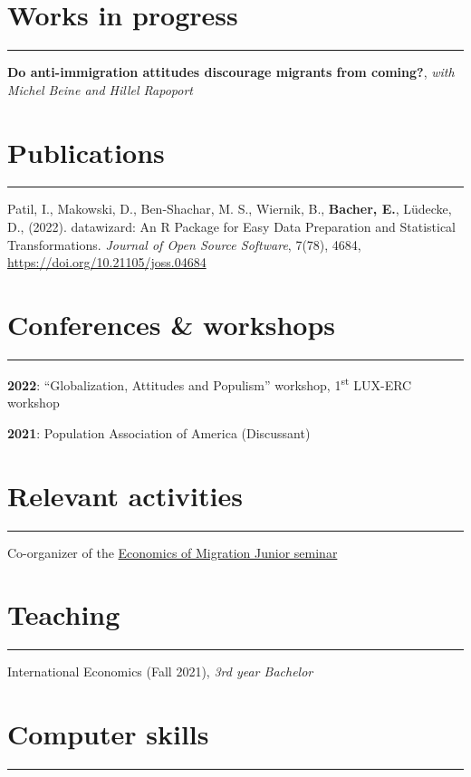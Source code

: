 \documentclass{article}
\newcommand{\sectionline}{%
  \vspace{-0.5cm}%
  \par\noindent\rule{\textwidth}{0.4pt}%
  \vspace{0.3cm}%
}
\let\xsection=\section
\renewcommand{\section}[1]{%
  \vspace{0.4cm}%
  \xsection*{#1}%
  \sectionline%
}
\begin{document}
\hypertarget{works-in-progress}{%
\section{Works in progress}\label{works-in-progress}}

\textbf{Do anti-immigration attitudes discourage migrants from coming?},
\emph{with Michel Beine and Hillel Rapoport}

\hypertarget{publications}{%
\section{Publications}\label{publications}}

Patil, I., Makowski, D., Ben-Shachar, M. S., Wiernik, B.,
\textbf{Bacher, E.}, Lüdecke, D., (2022). datawizard: An R Package for
Easy Data Preparation and Statistical Transformations. \emph{Journal of
Open Source Software}, 7(78), 4684,
\url{https://doi.org/10.21105/joss.04684}

\hypertarget{conferences-workshops}{%
\section{Conferences \& workshops}\label{conferences-workshops}}

\textbf{2022}: ``Globalization, Attitudes and Populism'' workshop,
1\textsuperscript{st} LUX-ERC workshop

\textbf{2021}: Population Association of America (Discussant)

\hypertarget{relevant-activities}{%
\section{Relevant activities}\label{relevant-activities}}

Co-organizer of the
\href{https://sites.google.com/view/the-economics-of-migration}{Economics
of Migration Junior seminar}

\hypertarget{teaching}{%
\section{Teaching}\label{teaching}}

International Economics (Fall 2021), \emph{3rd year Bachelor}

\hypertarget{computer-skills}{%
\section{Computer skills}\label{computer-skills}}
\end{document}
